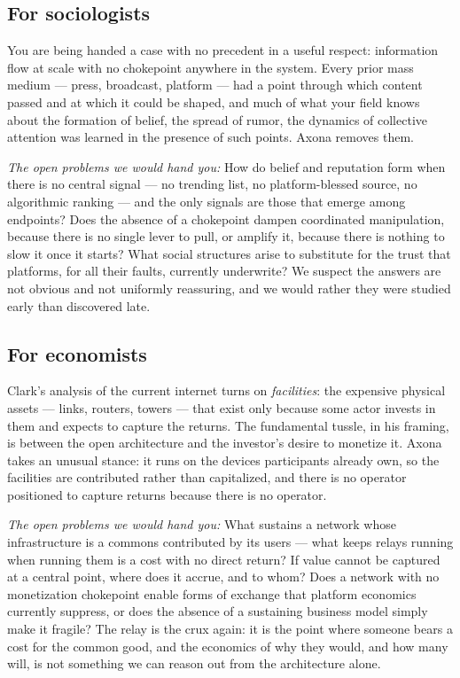 \documentclass[nobib,justified]{tufte-handout}
\begin{document}
\subsection{For sociologists}

You are being handed a case with no precedent in a useful respect: information
flow at scale with no chokepoint anywhere in the system. Every prior mass medium
--- press, broadcast, platform --- had a point through which content passed and at
which it could be shaped, and much of what your field knows about the formation of
belief, the spread of rumor, the dynamics of collective attention was learned in
the presence of such points. Axona removes them.

\emph{The open problems we would hand you:} How do belief and reputation form when
there is no central signal --- no trending list, no platform-blessed source, no
algorithmic ranking --- and the only signals are those that emerge among
endpoints? Does the absence of a chokepoint dampen coordinated manipulation,
because there is no single lever to pull, or amplify it, because there is nothing
to slow it once it starts? What social structures arise to substitute for the
trust that platforms, for all their faults, currently underwrite? We suspect the
answers are not obvious and not uniformly reassuring, and we would rather they
were studied early than discovered late.

\subsection{For economists}

Clark's analysis of the current internet turns on \emph{facilities}: the expensive
physical assets --- links, routers, towers --- that exist only because some actor
invests in them and expects to capture the returns. The fundamental tussle, in his
framing, is between the open architecture and the investor's desire to monetize
it. Axona takes an unusual stance: it runs on the devices participants already
own, so the facilities are contributed rather than capitalized, and there is no
operator positioned to capture returns because there is no operator.

\emph{The open problems we would hand you:} What sustains a network whose
infrastructure is a commons contributed by its users --- what keeps relays running
when running them is a cost with no direct return? If value cannot be captured at a
central point, where does it accrue, and to whom? Does a network with no
monetization chokepoint enable forms of exchange that platform economics currently
suppress, or does the absence of a sustaining business model simply make it
fragile? The relay is the crux again: it is the point where someone bears a cost
for the common good, and the economics of why they would, and how many will, is not
something we can reason out from the architecture alone.
\end{document}
